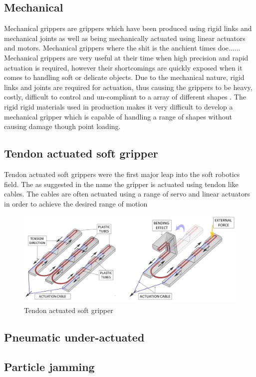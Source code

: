 \documentclass[11pt]{article}
\begin{document}
\subsection{Mechanical}
Mechanical grippers are grippers which have been produced using rigid links and mechanical joints as well as being mechanically actuated using linear actuators and motors. Mechanical grippers where the shit is the anchient times doe......
Mechanical grippers are very useful at their time when high precision and rapid actuation is required, however their shortcomings are quickly exposed when it comes to handling soft or delicate objects. Due to the mechanical nature, rigid links and joints are required for actuation, thus causing the grippers to be heavy, costly, difficult to control and un-compliant to a array of different shapes \cite{martinez2014soft}. The rigid rigid materials used in production makes it very difficult to develop a mechanical gripper which is capable of handling a range of shapes without causing damage though point loading.

\subsection{Tendon actuated soft gripper}
Tendon actuated soft grippers were the first major leap into the soft robotics field. The as suggested in the name the gripper is actuated using tendon like cables. The cables are often actuated using a range of servo and linear actuators in order to achieve the desired range of motion \cite{marchese2015recipe, dollar2010contact}
\begin{figure}[h]
\centering
\includegraphics[scale=0.45]{Tendon}
\caption{Tendon actuated soft gripper}
\label{fig:Picking}
\end{figure}
\subsection{Pneumatic under-actuated}
\subsection{Particle jamming}
\end{document}
